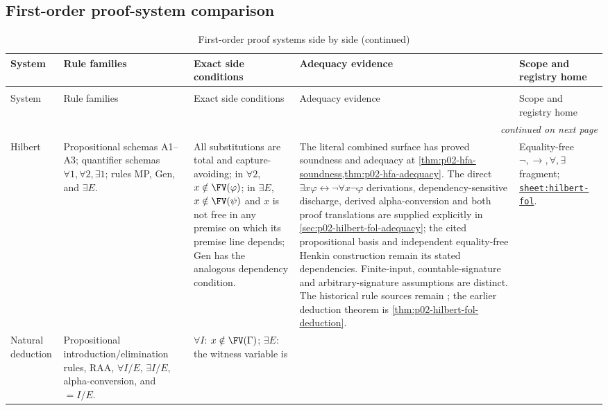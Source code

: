\begin{landscape}
\section{First-order proof-system comparison}
\label{sec:p02-fol-calculi-comparison}

\begingroup\scriptsize\setlength{\tabcolsep}{3pt}
\begin{longtable}{@{}p{.65in}p{1.35in}p{1.95in}p{1.90in}p{1.25in}@{}}
\caption{First-order proof systems side by side.}
\label{tab:p02-fol-proof-systems}\\
\toprule
System & Rule families & Exact side conditions & Adequacy evidence & Scope and registry home \\ \midrule
\endfirsthead
\caption[]{First-order proof systems side by side (continued)}\\
\toprule
System & Rule families & Exact side conditions & Adequacy evidence & Scope and registry home \\ \midrule
\endhead
\midrule\multicolumn{5}{r}{\emph{continued on next page}}\\
\endfoot
\endlastfoot
Hilbert & Propositional schemas A1--A3; quantifier schemas
\(\forall1,\forall2,\exists1\); rules MP, Gen, and \(\exists E\). & All substitutions are
total and capture-avoiding; in \(\forall2\), \(x\notin\FV(\varphi)\); in
\(\exists E\), \(x\notin\FV(\psi)\) and \(x\) is not free in any premise on
which its premise line depends; Gen has the analogous dependency condition. &
The literal combined surface has proved soundness and adequacy at
\cref{thm:p02-hfa-soundness,thm:p02-hfa-adequacy}. The direct
\(\exists x\varphi\leftrightarrow\neg\forall x\neg\varphi\)
derivations, dependency-sensitive discharge, derived alpha-conversion and
both proof translations are supplied explicitly in
\cref{sec:p02-hilbert-fol-adequacy}; the cited propositional basis and
independent equality-free Henkin construction remain its stated
dependencies. Finite-input, countable-signature and arbitrary-signature
assumptions are distinct. The historical rule sources remain
\cite{Mendelson1997,Kleene1952}; the earlier deduction theorem is
\cref{thm:p02-hilbert-fol-deduction}. & Equality-free
\(\neg,\to,\forall,\exists\) fragment;
\hyperref[sheet:hilbert-fol]{\texttt{sheet:hilbert-fol}}. \\
Natural deduction & Propositional introduction/elimination rules, RAA,
\(\forall I/E\), \(\exists I/E\), alpha-conversion, and \(=I/E\). &
\(\forall I\): \(x\notin\FV(\Gamma)\); \(\exists E\): the witness variable is

\end{longtable}
\end{landscape}
